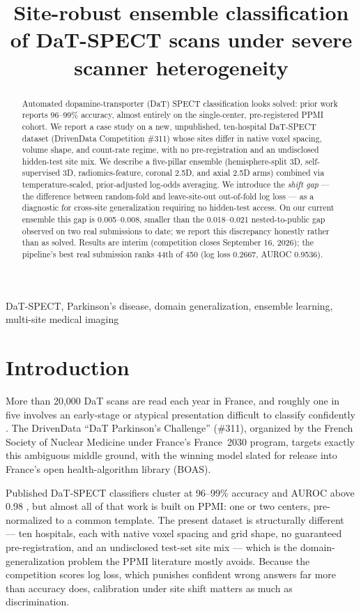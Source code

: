 \documentclass{article}
\title{Site-robust ensemble classification of DaT-SPECT scans under severe scanner heterogeneity}
\begin{document}
\maketitle

\begin{abstract}
Automated dopamine-transporter (DaT) SPECT classification looks solved: prior work reports 96--99\% accuracy, almost entirely on the single-center, pre-registered PPMI cohort. We report a case study on a new, unpublished, ten-hospital DaT-SPECT dataset (DrivenData Competition \#311) whose sites differ in native voxel spacing, volume shape, and count-rate regime, with no pre-registration and an undisclosed hidden-test site mix. We describe a five-pillar ensemble (hemisphere-split 3D, self-supervised 3D, radiomics-feature, coronal 2.5D, and axial 2.5D arms) combined via temperature-scaled, prior-adjusted log-odds averaging. We introduce the \emph{shift gap} --- the difference between random-fold and leave-site-out out-of-fold log loss --- as a diagnostic for cross-site generalization requiring no hidden-test access. On our current ensemble this gap is 0.005--0.008, smaller than the 0.018--0.021 nested-to-public gap observed on two real submissions to date; we report this discrepancy honestly rather than as solved. Results are interim (competition closes September 16, 2026); the pipeline's best real submission ranks 44th of 450 (log loss 0.2667, AUROC 0.9536).
\end{abstract}

\begin{keywords}
DaT-SPECT, Parkinson's disease, domain generalization, ensemble learning, multi-site medical imaging
\end{keywords}

\section{Introduction}
\label{sec:intro}

More than 20{,}000 DaT scans are read each year in France, and roughly one in five involves an early-stage or atypical presentation difficult to classify confidently \cite{isbi_challenge}. The DrivenData ``DaT Parkinson's Challenge'' (\#311), organized by the French Society of Nuclear Medicine under France's France~2030 program, targets exactly this ambiguous middle ground, with the winning model slated for release into France's open health-algorithm library (BOAS).

Published DaT-SPECT classifiers cluster at 96--99\% accuracy and AUROC above 0.98 \cite{choi2017,quan2019,ensemblefusion2022}, but almost all of that work is built on PPMI: one or two centers, pre-normalized to a common template. The present dataset is structurally different --- ten hospitals, each with native voxel spacing and grid shape, no guaranteed pre-registration, and an undisclosed test-set site mix --- which is the domain-generalization problem the PPMI literature mostly avoids. Because the competition scores log loss, which punishes confident wrong answers far more than accuracy does, calibration under site shift matters as much as discrimination.
\end{document}
